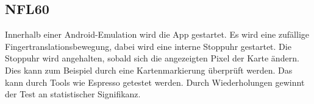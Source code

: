 \subsection*{NFL60}

Innerhalb einer Android-Emulation wird die App gestartet.
Es wird eine zufällige Fingertranslationsbewegung, dabei wird eine interne Stoppuhr gestartet.
Die Stoppuhr wird angehalten, sobald sich die angezeigten Pixel der Karte ändern.
Dies kann zum Beispiel durch eine Kartenmarkierung überprüft werden.
Das kann durch Tools wie Espresso getestet werden.
Durch Wiederholungen gewinnt der Test an statistischer Signifikanz.